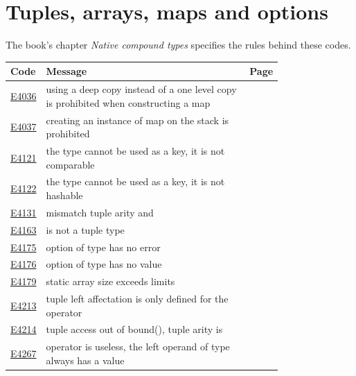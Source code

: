 
\clearpage
\section{Tuples, arrays, maps and options}
\label{sec:codes:compound}

The book's chapter \textit{Native compound types} specifies the rules behind these codes.

\begin{longtable}{@{}l p{0.78\linewidth} r@{}}
\toprule Code & Message & Page\\ \midrule \endhead
\hyperref[sec:codes:e4036]{E4036} & using a deep copy instead of a one level copy is prohibited when constructing a map \errhole{} & \pageref{sec:codes:e4036}\\
\hyperref[sec:codes:e4037]{E4037} & creating an instance of map \errhole{} on the stack is prohibited & \pageref{sec:codes:e4037}\\
\hyperref[sec:codes:e4121]{E4121} & the type \errhole{} cannot be used as a key, it is not comparable & \pageref{sec:codes:e4121}\\
\hyperref[sec:codes:e4122]{E4122} & the type \errhole{} cannot be used as a key, it is not hashable & \pageref{sec:codes:e4122}\\
\hyperref[sec:codes:e4131]{E4131} & mismatch tuple arity \errhole{} and \errhole{} & \pageref{sec:codes:e4131}\\
\hyperref[sec:codes:e4163]{E4163} & \errhole{} is not a tuple type & \pageref{sec:codes:e4163}\\
\hyperref[sec:codes:e4175]{E4175} & option of type \errhole{} has no error & \pageref{sec:codes:e4175}\\
\hyperref[sec:codes:e4176]{E4176} & option of type \errhole{} has no value & \pageref{sec:codes:e4176}\\
\hyperref[sec:codes:e4179]{E4179} & static array size \errhole{} exceeds limits \errhole{} & \pageref{sec:codes:e4179}\\
\hyperref[sec:codes:e4213]{E4213} & tuple left affectation is only defined for the operator \errhole{} & \pageref{sec:codes:e4213}\\
\hyperref[sec:codes:e4214]{E4214} & tuple access out of bound(\errhole{}), tuple arity is \errhole{} & \pageref{sec:codes:e4214}\\
\hyperref[sec:codes:e4267]{E4267} & operator \errhole{} is useless, the left operand of type \errhole{} always has a value & \pageref{sec:codes:e4267}\\
\bottomrule
\end{longtable}

